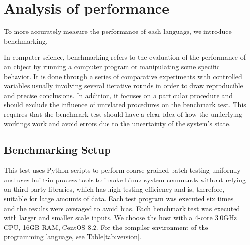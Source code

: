 \section{Analysis of performance}

To more accurately measure the performance of each language, we introduce benchmarking.

In computer science, benchmarking refers to the evaluation of
the performance of an object by running a computer program or
manipulating some specific behavior\cite{fleming1986not}.
It is done through a series of comparative experiments with
controlled variables usually involving several iterative rounds
in order to draw reproducible and precise conclusions.
In addition, it focuses on a particular procedure and
should exclude the influence of unrelated procedures on
the benchmark test.
This requires that the benchmark test should have a
clear idea of how the underlying workings work and avoid errors
due to the uncertainty of the system's state.

\subsection{Benchmarking Setup}


This test uses Python scripts to perform coarse-grained
batch testing uniformly and uses built-in process tools
to invoke Linux system commands without relying on
third-party libraries, which has high testing efficiency
and is, therefore, suitable for large amounts of data.
Each test program was executed six times, and the results
were averaged to avoid bias.
Each benchmark test was
executed with larger and smaller scale inputs.
We choose the host with a 4-core 3.0GHz CPU, 16GB RAM, CentOS 8.2.
For the compiler environment of the programming
language, see Table\ref{tab:version}.

